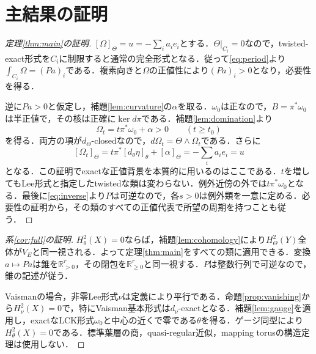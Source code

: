 \documentclass[12pt]{amsart}
\theoremstyle{definition}
\theoremstyle{remark}
\numberwithin{equation}{section}
\newcommand{\R}{\mathbb{R}}
\begin{document}
\section{主結果の証明}\label{sec:proofs}
\begin{proof}[定理\ref{thm:main}の証明]
$[\Omega]_\Theta=u=-\sum_i a_ie_i$とする．$\Theta|_{C_i}=0$なので，twisted-exact形式を$C_i$に制限すると通常の完全形式となる．従って\eqref{eq:period}より$\int_{C_i}\Omega=(Pa)_i$である．複素向きと$\Omega$の正値性により$(Pa)_i>0$となり，必要性を得る．

逆に$Pa>0$と仮定し，補題\ref{lem:curvature}の$\alpha$を取る．$\omega_0$は正なので，$B=\pi^*\omega_0$は半正値で，その核は正確に$\ker d\pi$である．補題\ref{lem:domination}より
\begin{equation}\label{eq:construction}
 \Omega_t=t\pi^*\omega_0+\alpha>0\qquad(t\geq t_0)
\end{equation}
を得る．両方の項が$d_\Theta$-closedなので，$d\Omega_t=\Theta\wedge\Omega_t$である．さらに
\[
 [\Omega_t]_\Theta=t\pi^*[d_\theta\eta]_\theta+[\alpha]_\Theta
 =-\sum_i a_ie_i=u
\]
となる．この証明でexactな正値背景を本質的に用いるのはここである．$t$を増してもLee形式と指定したtwistedな類は変わらない．例外近傍の外では$t\pi^*\omega_0$となる．最後に\eqref{eq:inverse}より$P$は可逆なので，各$s>0$は例外類を一意に定める．必要性の証明から，その類のすべての正値代表で所望の周期を持つことも従う．
\end{proof}

\begin{proof}[系\ref{cor:full}の証明]
$H^2_\theta(X)=0$ならば，補題\ref{lem:cohomology}により$H^2_\Theta(Y)$全体が$V_E$と同一視される．よって定理\ref{thm:main}をすべての類に適用できる．変換$a\mapsto Pa$は錐を$\R_{>0}^r$，その閉包を$\R_{\geq0}^r$と同一視する．$P$は整数行列で可逆なので，錐の記述が従う．

Vaismanの場合，非零Lee形式$\nu$は定義により平行である．命題\ref{prop:vanishing}から$H^2_\nu(X)=0$で，特にVaisman基本形式は$d_\nu$-exactとなる．補題\ref{lem:gauge}を適用し，exactなLCK形式$\omega_0$と中心の近くで零である$\theta$を得る．ゲージ同型により$H^2_\theta(X)=0$である．標準葉層の商，quasi-regular近似，mapping torusの構造定理は使用しない．
\end{proof}
\end{document}

